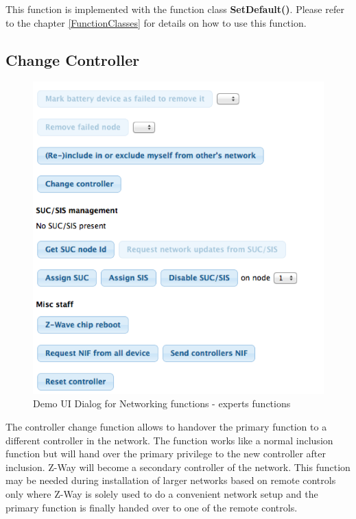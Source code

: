 This function is implemented with the function class {\bf SetDefault()}. Please refer 
to the chapter \ref{FunctionClasses} for details on how to use this function.

\subsection{Change Controller }

\begin{figure} 
\begin{center}
\includegraphics[scale=0.8]{pics/network2.png}
\caption{Demo UI Dialog for Networking functions - experts functions}
\label{c1:network2} 
\end{center} \end{figure}


The controller change function allows to handover the primary function to a different 
controller in the network. The function works like a normal inclusion 
function but will hand over the primary privilege to the new controller after inclusion. 
Z-Way will become a secondary controller of the network. This function may be needed 
during installation of larger networks based on remote controls only where Z-Way is 
solely used to do a convenient network 
setup and the primary function is finally handed over to one of the remote controls.

